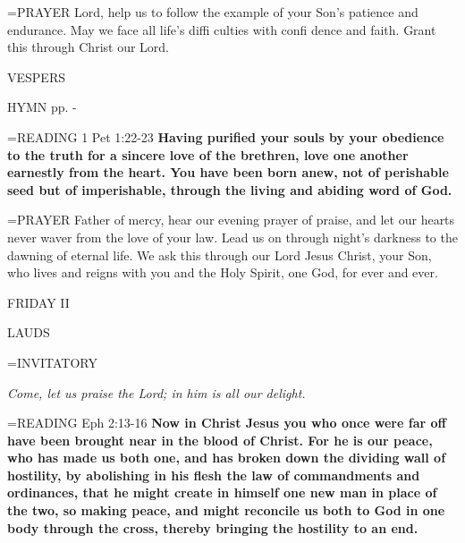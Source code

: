\hangindent=\parindent \small{PRAYER  Lord, help us to follow the example of your Son’s patience and endurance. May we face all life’s diffi culties with confi dence and faith. Grant this through Christ our Lord.}

\begin{flushleft}\normalsize VESPERS\\\end{flushleft}
HYMN pp. \pageref{ordinaryTime:fourthHymn} - \pageref{ordinaryTime:sixthHymn}

\hangindent=\parindent \small{READING} 1 Pet 1:22-23 \textbf{Having purified your souls by your obedience to the truth for a sincere love of the brethren, love one another earnestly from the heart. You have been born anew, not of perishable seed but of imperishable, through the living and abiding word of God.\\}

\hangindent=\parindent \small{PRAYER  Father of mercy, hear our evening prayer of praise, and let our hearts never waver from the love of your law. Lead us on through night’s darkness to the dawning of eternal life. We ask this through our Lord Jesus Christ, your Son, who lives and reigns with you and the Holy Spirit, one God, for ever and ever.}

\begin{center}
\normalsize FRIDAY II
\end{center}

\begin{flushleft}\normalsize LAUDS\\\end{flushleft}

\hangindent=\parindent \small{INVITATORY}
\begin{center}
\textit{Come, let us praise the Lord; in him is all our delight.\\}
\end{center}

\hangindent=\parindent \small{READING} Eph 2:13-16 \textbf{Now in Christ Jesus you who once were far off have been brought near in the blood of Christ. For he is our peace, who has made us both one, and has broken down the dividing wall of hostility, by abolishing in his flesh the law of commandments and ordinances, that he might create in himself one new man in place of the two, so making peace, and might reconcile us both to God in one body through the cross, thereby bringing the hostility to an end.\\}

